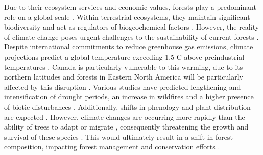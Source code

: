 Due to their ecosystem services and economic values, forests play a predominant role on a global scale \citep{Balvanera2006Quantifyingevidence}. 
Within terrestrial ecosystems, they maintain significant biodiversity and act as regulators of biogeochemical factors \citep{Pawson2013Plantationforests}. 
However, the reality of climate change poses urgent challenges to the sustainability of current forests \citep{McKenney2009Climatechange,Trumbore2015Foresthealth,Seidl2017Forestdisturbances,Messier2022Warningnatural}. 
Despite international commitments to reduce greenhouse gas emissions, climate projections predict a global temperature exceeding 1.5 C above preindustrial temperatures \citep{Matthews2022Currentglobal}. 
Canada is particularly vulnerable to this warming, due to its northern latitudes \citep{Alo2008Potentialfuture,Bush2019Canadachanging} and forests in Eastern North America will be particularly affected by this disruption \citep{Park2014Canboreal,Mahony2017closerlook,Sittaro2017Treerange,Messier2022Warningnatural}. 
Various studies have predicted lengthening and intensification of drought periods, an increase in wildfires and a higher presence of biotic disturbances \citep{Parmesan2007Influencesspecies,Joyce2013Climatechange,Gatti2021Amazoniacarbon,Heidari2021Effectsclimate}. 
Additionally, shifts in phenology and plant distribution are expected \citep{Aitken2008Adaptationmigration,Chuine2010Whydoes,Zhu2012Failuremigrate,Gray2013Trackingsuitable}. 
However, climate changes are occurring more rapidly than the ability of trees to adapt or migrate \citep{Aitken2008Adaptationmigration,Loarie2009velocityclimate,Vitt2010Assistedmigration,Harrison2020Plantcommunity}, 
consequently threatening the growth and survival of these species \citep{Zhu2012Failuremigrate,Sittaro2017Treerange,Woodall2018Decadalchanges}.
This would ultimately result in a shift in forest composition, impacting forest management and conservation efforts \citep{McKenney2009Climatechange,Chmura2011Forestresponses,Lo2011Linkingclimate}.

